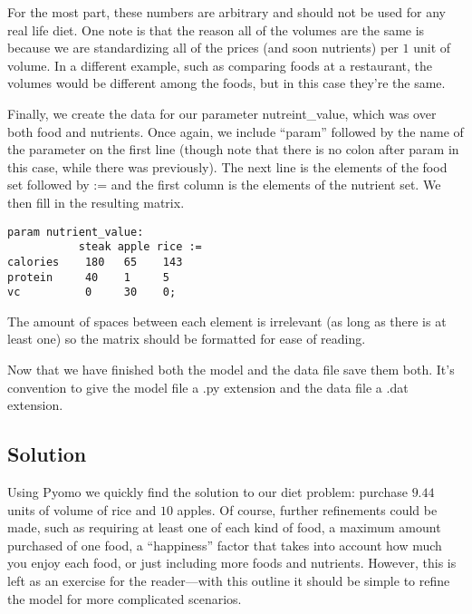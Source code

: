 \documentclass{article}
\begin{document}
For the most part, these numbers are arbitrary and should not be used for any real life diet.  One note is that the reason all of the volumes are the same is because we are standardizing all of the prices (and soon nutrients) per $1$ unit of volume.  In a different example, such as comparing foods at a restaurant, the volumes would be different among the foods, but in this case they're the same.

Finally, we create the data for our parameter nutreint\_value, which was over both food and nutrients.  Once again, we include ``param'' followed by the name of the parameter on the first line (though note that there is no colon after param in this case, while there was previously).  The next line is the elements of the food set followed by := and the first column is the elements of the nutrient set.  We then fill in the resulting matrix.

\begin{verbatim}
param nutrient_value:
           steak apple rice :=
calories    180   65    143
protein     40    1     5
vc          0     30    0;
\end{verbatim}

The amount of spaces between each element is irrelevant (as long as there is at least one) so the matrix should be formatted for ease of reading.

Now that we have finished both the model and the data file save them both. It's convention to give the model file a .py extension and the data file a .dat extension.

\subsection*{Solution}

Using Pyomo we quickly find the solution to our diet problem: purchase $9.44$ units of volume of rice and $10$ apples. Of course, further refinements could be made, such as requiring at least one of each kind of food, a maximum amount purchased of one food, a ``happiness'' factor that takes into account how much you enjoy each food, or just including more foods and nutrients.  However, this is left as an exercise for the reader---with this outline it should be simple to refine the model for more complicated scenarios.
\end{document}
